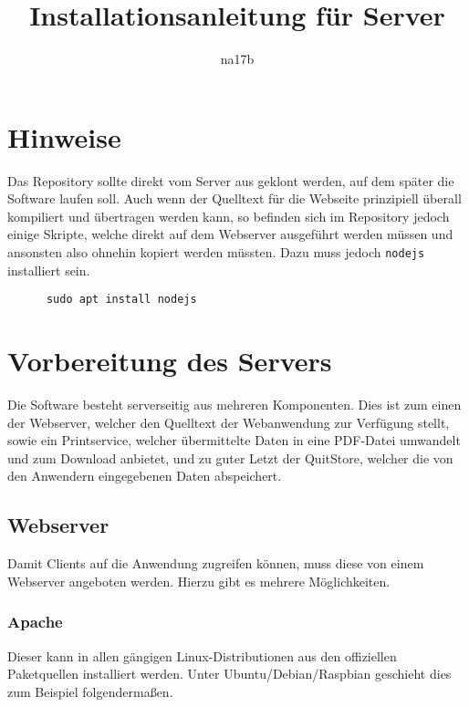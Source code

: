 \documentclass[a4paper,11pt,oneside, titlepage]{article}
\title{Installationsanleitung für Server}
\author{na17b}
\date{}
\begin{document}
  \maketitle

  \tableofcontents

  \section{Hinweise}

    Das Repository sollte direkt vom Server aus geklont werden, auf dem später
    die Software laufen soll. Auch wenn der Quelltext für die Webseite prinzipiell
    überall kompiliert und übertragen werden kann, so befinden sich im Repository jedoch
    einige Skripte, welche direkt auf dem Webserver ausgeführt werden müssen und ansonsten
    also ohnehin kopiert werden müssten. Dazu muss jedoch \verb+nodejs+ installiert sein.

    \begin{lstlisting}
      sudo apt install nodejs \end{lstlisting}

  \section{Vorbereitung des Servers}

    Die Software besteht serverseitig aus mehreren Komponenten. Dies ist zum
    einen der Webserver, welcher den Quelltext der Webanwendung zur Verfügung stellt,
    sowie ein Printservice, welcher übermittelte Daten in eine PDF-Datei umwandelt
    und zum Download anbietet, und zu guter Letzt der QuitStore, welcher die von den
    Anwendern eingegebenen Daten abspeichert.

    \subsection{Webserver}

      Damit Clients auf die Anwendung zugreifen können, muss diese von einem Webserver
      angeboten werden. Hierzu gibt es mehrere Möglichkeiten.

        \subsubsection{Apache}

          Dieser kann in allen gängigen Linux-Distributionen aus den offiziellen Paketquellen
          installiert werden. Unter Ubuntu/Debian/Raspbian geschieht dies zum Beispiel
          folgendermaßen.
\end{document}
